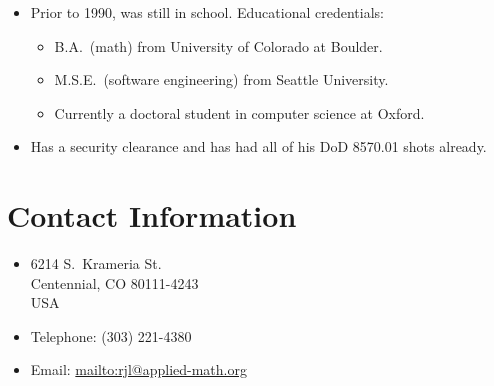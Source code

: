\documentclass[12pt,letterpaper]{article}
\begin{document}
\begin{itemize}
	\item Prior to 1990, was still in school.  Educational credentials:
		\begin{itemize}
			\item B.A.\ (math) from University of Colorado at Boulder.
			\item M.S.E.\ (software engineering) from Seattle University.
			\item Currently a doctoral student in computer science at Oxford.
		\end{itemize}

	\item Has a security clearance and has had all of his DoD 8570.01 shots already.
\end{itemize}

\section*{Contact Information}

\begin{itemize}
	\item 6214 S.\ Krameria St. \\
		Centennial, CO 80111-4243 \\
		USA

	\item Telephone: (303) 221-4380

	\item Email: \url{mailto:rjl@applied-math.org}
\end{itemize}

\vfill{}
\end{document}
